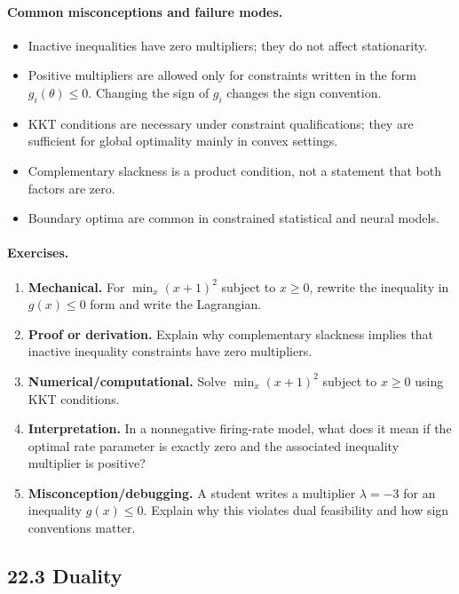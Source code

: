 \paragraph{Common misconceptions and failure modes.}
\begin{itemize}[leftmargin=*]
\item Inactive inequalities have zero multipliers; they do not affect stationarity.
\item Positive multipliers are allowed only for constraints written in the form \(g_i(\theta)\le 0\). Changing the sign of \(g_i\) changes the sign convention.
\item KKT conditions are necessary under constraint qualifications; they are sufficient for global optimality mainly in convex settings.
\item Complementary slackness is a product condition, not a statement that both factors are zero.
\item Boundary optima are common in constrained statistical and neural models.
\end{itemize}

\paragraph{Exercises.}
\begin{enumerate}[label=\textbf{22.2.\arabic*.}, leftmargin=*]
\item \textbf{Mechanical.} For \(\min_x (x+1)^2\) subject to \(x\ge 0\), rewrite the inequality in \(g(x)\le 0\) form and write the Lagrangian.
\item \textbf{Proof or derivation.} Explain why complementary slackness implies that inactive inequality constraints have zero multipliers.
\item \textbf{Numerical/computational.} Solve \(\min_x (x+1)^2\) subject to \(x\ge 0\) using KKT conditions.
\item \textbf{Interpretation.} In a nonnegative firing-rate model, what does it mean if the optimal rate parameter is exactly zero and the associated inequality multiplier is positive?
\item \textbf{Misconception/debugging.} A student writes a multiplier \(\lambda=-3\) for an inequality \(g(x)\le 0\). Explain why this violates dual feasibility and how sign conventions matter.
\end{enumerate}

\subsection{22.3 Duality}

